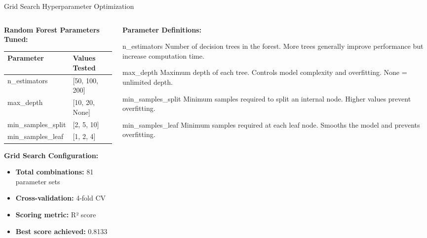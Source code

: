 \documentclass[aspectratio=169]{beamer}
\begin{document}
\begin{frame}{Grid Search Hyperparameter Optimization}
\begin{columns}
\begin{column}{0.5\textwidth}
\textbf{Random Forest Parameters Tuned:}
\begin{table}[h]
\centering
\small
\begin{tabular}{@{}ll@{}}
\toprule
\textbf{Parameter} & \textbf{Values Tested} \\
\midrule
n\_estimators & [50, 100, 200] \\
max\_depth & [10, 20, None] \\
min\_samples\_split & [2, 5, 10] \\
min\_samples\_leaf & [1, 2, 4] \\
\bottomrule
\end{tabular}
\end{table}

\vspace{0.3cm}
\textbf{Grid Search Configuration:}
\begin{itemize}
\item \textbf{Total combinations:} 81 parameter sets
\item \textbf{Cross-validation:} 4-fold CV
\item \textbf{Scoring metric:} R² score
\item \textbf{Best score achieved:} 0.8133
\end{itemize}
\end{column}
\begin{column}{0.5\textwidth}
\textbf{Parameter Definitions:}

\begin{block}{n\_estimators}
Number of decision trees in the forest. More trees generally improve performance but increase computation time.
\end{block}

\begin{block}{max\_depth}
Maximum depth of each tree. Controls model complexity and overfitting. None = unlimited depth.
\end{block}

\begin{block}{min\_samples\_split}
Minimum samples required to split an internal node. Higher values prevent overfitting.
\end{block}

\begin{block}{min\_samples\_leaf}
Minimum samples required at each leaf node. Smooths the model and prevents overfitting.
\end{block}
\end{column}
\end{columns}
\end{frame}
\end{document}
